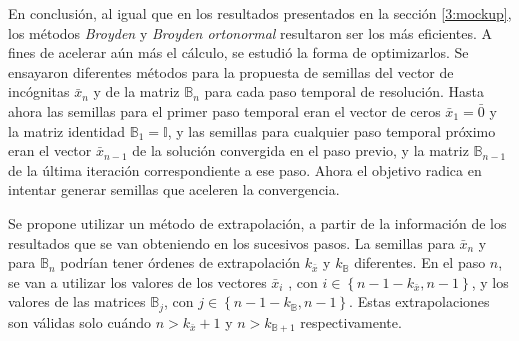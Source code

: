 En conclusión, al igual que en los resultados presentados en la sección \ref{3:mockup}, los métodos \textit{Broyden} y \textit{Broyden ortonormal} resultaron ser los más eficientes.
A fines de acelerar aún más el cálculo, se estudió la forma de optimizarlos.
Se ensayaron diferentes métodos para la propuesta de semillas del vector de incógnitas $\bar{x}_n$ y de la matriz $\mathbb{B}_n$ para cada paso temporal de resolución.
Hasta ahora las semillas para el primer paso temporal eran el vector de ceros $\bar{x}_1=\bar{0}$ y la matriz identidad $\mathbb{B}_1=\mathbb{I}$,
y las semillas para cualquier paso temporal próximo eran el vector $\bar{x}_{n-1}$ de la solución convergida en el paso previo,
y la matriz $\mathbb{B}_{n-1}$ de la última iteración correspondiente a ese paso.
Ahora el objetivo radica en intentar generar semillas que aceleren la convergencia.

Se propone utilizar un método de extrapolación, a partir de la información de los resultados que se van obteniendo en los sucesivos pasos.
La semillas para $\bar{x}_n$ y para $\mathbb{B}_n$ podrían tener órdenes de extrapolación $k_{\bar{x}}$ y $k_{\mathbb{B}}$ diferentes.
En el paso $n$, se van a utilizar los valores de los vectores $\bar{x}_i$ , con $i  \in  \left \{ n-1-k_{\bar{x}}, n-1\right \}$,
y los valores de las matrices $\mathbb{B}_j$, con $j  \in  \left \{ n-1-k_{\mathbb{B}}, n-1\right \}$.
Estas extrapolaciones son válidas solo cuándo $n>k_{\bar{x}}+1$ y $n>k_{\mathbb{B}+1}$ respectivamente.

